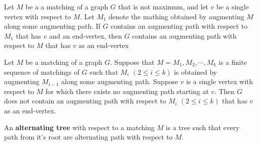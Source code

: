 \begin{theorem}
	Let $M$ be a a matching of a graph $G$ that is not maximum, and let $v$ be a single vertex with respect to $M$. Let $M_1$ denote the mathing obtained by augmenting $M$ along some augmenting path. If $G$ contains an augmenting path with respect to $M_1$ that has $v$ and an end-vertex, then $G$ contains an augmenting path with respect to $M$ that has $v$ as an end-vertex
\end{theorem}
\begin{corollary}
	Let $M$ be a matching of a graph $G$. Suppose that $M = M_1,M_2,\cdots,M_k$ is a finite sequence of matchings of $G$ such that $M_i$ $(2 \le i \le k)$ is obtained by augmenting $M_{i-1}$ along some augmenting path. Suppose $v$ is a single vertex with respect to $M$ for which there exists no augmenting path starting at $v$. Then $G$ does not contain an augmenting path with respect to $M_i$ $(2 \le i \le k)$ that has $v$ as an end-vertex.
\end{corollary}

\begin{definition}
	An \textbf{alternating tree} with respect to a matching $M$ is a tree such that every path from it's root are alternating path with respect to $M$.
\end{definition}

